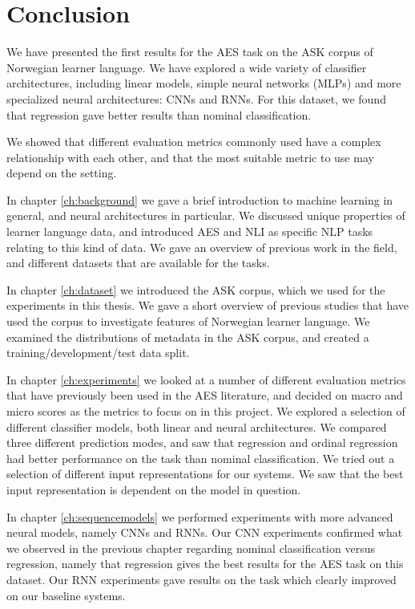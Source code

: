 \chapter{Conclusion} \label{ch:conclusion}

We have presented the first results for the \ac{AES} task on the ASK corpus
of Norwegian learner language. We have explored a wide variety of classifier
architectures, including linear models, simple neural networks (\acp{MLP})
and more specialized neural architectures: \acp{CNN} and \acp{RNN}. For this
dataset, we found that regression gave better results than nominal
classification.

We showed that different evaluation metrics commonly used have a complex
relationship with each other, and that the most suitable metric to use may
depend on the setting.

In chapter \ref{ch:background} we gave a brief introduction to machine
learning in general, and neural architectures in particular. We discussed
unique properties of learner language data, and introduced \ac{AES} and
\ac{NLI} as specific \ac{NLP} tasks relating to this kind of data. We gave an
overview of previous work in the field, and different datasets that are
available for the tasks.

In chapter \ref{ch:dataset} we introduced the ASK corpus, which we used for
the experiments in this thesis. We gave a short overview of previous studies
that have used the corpus to investigate features of Norwegian learner
language. We examined the distributions of metadata in the ASK corpus, and
created a training/development/test data split.

In chapter \ref{ch:experiments} we looked at a number of different evaluation
metrics that have previously been used in the \ac{AES} literature, and
decided on macro and micro \FI scores as the metrics to focus on in this
project. We explored a selection of different classifier models, both linear
and neural architectures. We compared three different prediction modes, and
saw that regression and ordinal regression had better performance on the task
than nominal classification. We tried out a selection of different input
representations for our systems. We saw that the best input representation is
dependent on the model in question.

In chapter \ref{ch:sequencemodels} we performed experiments with more
advanced neural models, namely \acp{CNN} and \acp{RNN}. Our CNN experiments
confirmed what we observed in the previous chapter regarding nominal
classification versus regression, namely that regression gives the best
results for the \ac{AES} task on this dataset. Our \ac{RNN} experiments gave
results on the task which clearly improved on our baseline systems.

